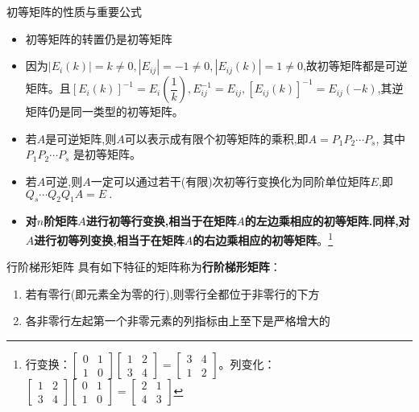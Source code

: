 \documentclass[8pt a4paper,oneside,UTF8]{ctexbook}
\begin{document}
\begin{sloppypar}
    \begin{defn}{初等矩阵的性质与重要公式}{}
        \begin{itemize}
            \item 初等矩阵的转置仍是初等矩阵
            \item 因为$\left|E_i(k)\right|=k\neq0,\left|E_{ij}\right|=-1\neq0,\left|E_{ij}(k)\right|=1\neq0$,故初等矩阵都是可逆矩阵。且$\left[E_i(k)\right]^{-1}=E_i\left(\dfrac{1}{k}\right), E_{ij}^{-1}=E_{ij} ,\left[E_{ij}(k)\right]^{-1}=E_{ij}(-k)$,其逆矩阵仍是同一类型的初等矩阵。
            \item 若$A$是可逆矩阵,则$A$可以表示成有限个初等矩阵的乘积,即$A=P_1P_2\cdots P_s$, 其中 $P_1P_2\cdots P_s$ 是初等矩阵。
            \item 若$A$可逆,则$A$一定可以通过若干(有限)次初等行变换化为同阶单位矩阵$E$,即$Q_s\cdots Q_2Q_1A=E\mathrm{~.}$
            \item \textbf{对$n$阶矩阵$A$进行初等行变换,相当于在矩阵$A$的左边乘相应的初等矩阵.同样,对$A$进行初等列变换,相当于在矩阵$A$的右边乘相应的初等矩阵}。\footnote{行变换：$\begin{bmatrix}0 & 1\\ 1 & 0 \end{bmatrix}\begin{bmatrix}1 & 2\\ 3 & 4 \end{bmatrix}=\begin{bmatrix}3 & 4\\ 1 & 2 \end{bmatrix}$。列变化：$\begin{bmatrix}1 & 2\\ 3 & 4 \end{bmatrix}\begin{bmatrix}0 & 1\\ 1 & 0 \end{bmatrix}=\begin{bmatrix}2 & 1\\ 4 & 3 \end{bmatrix}$}
        \end{itemize}
    \end{defn}
    \begin{defn}{行阶梯形矩阵}{}
        具有如下特征的矩阵称为\textbf{行阶梯形矩阵}：
        \begin{enumerate}
            \item 若有零行(即元素全为零的行),则零行全都位于非零行的下方
            \item 各非零行左起第一个非零元素的列指标由上至下是严格增大的

\end{enumerate}
\end{defn}
\end{sloppypar}
\end{document}
